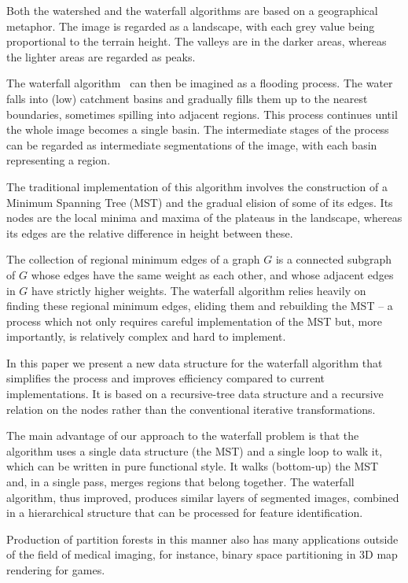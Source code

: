 \documentclass[12pt]{ouclprgsc}
\begin{document}
Both the watershed and the waterfall algorithms are based on a
geographical metaphor. The image is regarded as a landscape, with each
grey value being proportional to the terrain height. 
%
The valleys are
in the darker areas, whereas the lighter areas are regarded as peaks.

The waterfall algorithm~\cite{beucher,marcotegui} can then be imagined
as a flooding process. The water falls into (low) catchment basins and
gradually fills them up to the nearest boundaries, sometimes spilling
into adjacent regions. This process continues until the whole image
becomes a single basin. The intermediate stages of the process can be
regarded as intermediate segmentations of the image, with each basin
representing a region.

The traditional implementation of this algorithm \cite{marcotegui}
involves the construction of a Minimum Spanning Tree (MST) and the
gradual elision of some of its edges. Its nodes are the local minima
and maxima of the plateaus in the landscape, whereas its edges are the
relative difference in height between these.

The collection of regional minimum edges of a graph $G$ is a connected
subgraph of $G$ whose edges have the same weight as each other, and
whose adjacent edges in $G$ have strictly higher weights. The
waterfall algorithm relies heavily on finding these regional minimum
edges, eliding them and rebuilding the MST -- a process which not only
requires careful implementation of the MST but, more importantly, is
relatively complex and hard to implement.

In this paper we present a new data structure for the waterfall
algorithm that simplifies the process and improves efficiency compared
to current implementations. It is based on a recursive-tree data
structure and a recursive relation on the nodes rather than the
conventional iterative transformations.

The main advantage of our approach to the waterfall problem is that
the algorithm uses a single data structure (the MST) and a single loop
to walk it, which can be written in pure functional style. It walks
(bottom-up) the MST and, in a single pass, merges regions that belong
together.  The waterfall algorithm, thus improved, produces similar
layers of segmented images, combined in a hierarchical structure that
can be processed for feature identification.

Production of partition forests in this manner also has many
applications outside of the field of medical imaging, for instance,
binary space partitioning in 3D map rendering for games.
\end{document}
